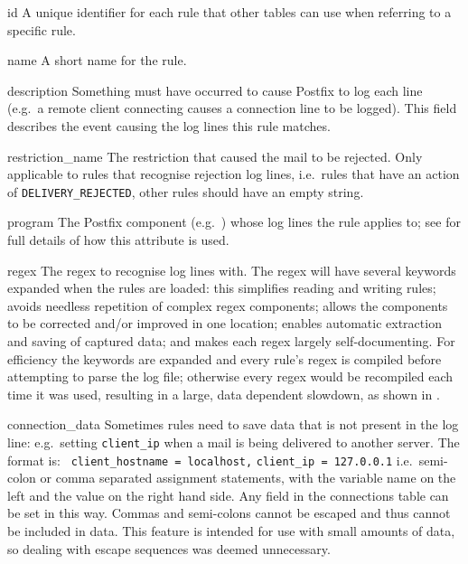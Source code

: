 \begin{boldeqlist}

    \item [id] A unique identifier for each rule that other tables can use
        when referring to a specific rule.

    \item [name] A short name for the rule.

    \item [description] Something must have occurred to cause Postfix to
        log each line (e.g.\ a remote client connecting causes a connection
        line to be logged).  This field describes the event causing the log
        lines this rule matches.

    \item [restriction\_name] The restriction that caused the mail to be
        rejected.  Only applicable to rules that recognise rejection log
        lines, i.e.\ rules that have an action of
        \texttt{DELIVERY\_REJECTED}, other rules should have an empty
        string.

    \item [program] The Postfix component (e.g.\ ) whose log
        lines the rule applies to; see  for full details of how this attribute is used.

    \item [regex] The regex to recognise log lines with.  The regex will
        have several keywords expanded when the rules are loaded: this
        simplifies reading and writing rules; avoids needless repetition of
        complex regex components; allows the components to be corrected
        and/or improved in one location; enables automatic extraction and
        saving of captured data; and makes each regex largely
        self-documenting.  For efficiency the keywords are expanded and
        every rule's regex is compiled before attempting to parse the log
        file; otherwise every regex would be recompiled each time it was
        used, resulting in a large, data dependent slowdown, as shown in
        .

    \item [connection\_data] Sometimes rules need to save data that is not
        present in the log line: e.g.\ setting \texttt{client\_ip} when a
        mail is being delivered to another server.  The format is:
        \newline{} \tab{} \texttt{ client\_hostname = localhost,}
        \newline{} \tab{} \tab{} \texttt{client\_ip = 127.0.0.1} \newline{}
        i.e.\ semi-colon or comma separated assignment statements, with the
        variable name on the left and the value on the right hand side.
        Any field in the connections table can be set in this way.  Commas
        and semi-colons cannot be escaped and thus cannot be included in
        data.  This feature is intended for use with small amounts of data,
        so dealing with escape sequences was deemed unnecessary.


\end{boldeqlist}
